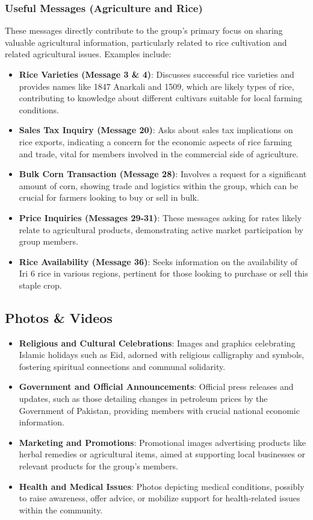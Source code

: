 \documentclass[12pt]{article}
\begin{document}
\subsubsection{Useful Messages (Agriculture and Rice)}
These messages directly contribute to the group's primary focus on sharing valuable agricultural information, particularly related to rice cultivation and related agricultural issues. Examples include:
\begin{itemize}
  \item \textbf{Rice Varieties (Message 3 \& 4)}: Discusses successful rice varieties and provides names like 1847 Anarkali and 1509, which are likely types of rice, contributing to knowledge about different cultivars suitable for local farming conditions.
  \item \textbf{Sales Tax Inquiry (Message 20)}: Asks about sales tax implications on rice exports, indicating a concern for the economic aspects of rice farming and trade, vital for members involved in the commercial side of agriculture.
  \item \textbf{Bulk Corn Transaction (Message 28)}: Involves a request for a significant amount of corn, showing trade and logistics within the group, which can be crucial for farmers looking to buy or sell in bulk.
  \item \textbf{Price Inquiries (Messages 29-31)}: These messages asking for rates likely relate to agricultural products, demonstrating active market participation by group members.
  \item \textbf{Rice Availability (Message 36)}: Seeks information on the availability of Iri 6 rice in various regions, pertinent for those looking to purchase or sell this staple crop.
\end{itemize}


\subsection{Photos \& Videos}
\begin{itemize}
  \item \textbf{Religious and Cultural Celebrations}: Images and graphics celebrating Islamic holidays such as Eid, adorned with religious calligraphy and symbols, fostering spiritual connections and communal solidarity.
  \item \textbf{Government and Official Announcements}: Official press releases and updates, such as those detailing changes in petroleum prices by the Government of Pakistan, providing members with crucial national economic information.
  \item \textbf{Marketing and Promotions}: Promotional images advertising products like herbal remedies or agricultural items, aimed at supporting local businesses or relevant products for the group's members.
  \item \textbf{Health and Medical Issues}: Photos depicting medical conditions, possibly to raise awareness, offer advice, or mobilize support for health-related issues within the community.
\end{itemize}
\end{document}
